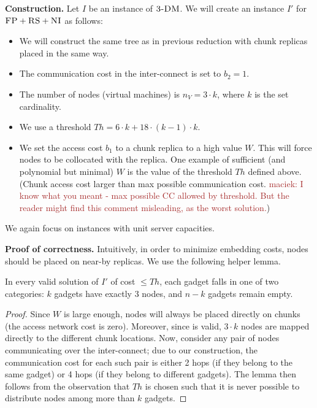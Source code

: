 \documentclass[9pt]{sigcomm-alternate}
\newcommand{\maciek}[1]{\textcolor{brown}{maciek: #1}}
\newcommand{\CC}{\textsc{NI}}
\newcommand{\FP}{\textsc{FP}}
\newcommand{\RS}{\textsc{RS}}
\newcommand{\CostTrans}{\ensuremath{b_1}}
\newcommand{\CostCom}{\ensuremath{b_2}}
\newcommand{\Vms}{\ensuremath{n_V}}
\newcommand{\TDM}{\textsc{3-DM}}
\newcommand{\Thr}{\ensuremath{Th}}
\begin{document}
\textbf{Construction.}
Let $I$ be an instance of $\TDM$. We will create an instance $I'$
for $\FP+\RS+\CC$ as follows:
\begin{itemize}
\item We will construct the same tree as in previous reduction with
chunk replicas placed in the same way.
\item The communication cost in the inter-connect is set to $\CostCom = 1$.
\item The number of nodes (virtual machines) is $\Vms = 3 \cdot k$, where $k$ is the set cardinality.
\item We use a threshold $\Thr =  6 \cdot k + 18 \cdot
(k - 1) \cdot k$.
\item We set the access cost $\CostTrans$ to a chunk replica to a high value $W$. This will force
nodes to be collocated with the replica. One example of sufficient
(and polynomial but minimal) $W$
is the value of the threshold $\Thr$ defined above. (Chunk access cost larger than max possible
communication cost. \maciek{I know what you meant - max possible CC allowed by threshold. But the reader might find this comment misleading, as the worst solution.})
\end{itemize}

We again focus on instances with unit server capacities.

\textbf{Proof of correctness.}
Intuitively, in order to minimize embedding costs,
nodes should be placed on near-by replicas. We use the following
helper lemma.
\begin{lemma}\label{lemma:helper}
In every valid solution of $I'$ of cost $\leq \Thr$, each gadget
falls in one of two categories:
$k$ gadgets have exactly
$3$ nodes, and $n-k$ gadgets remain empty.
\end{lemma}
\begin{proof}
Since $W$ is large enough, nodes will always be placed
directly on chunks (the access network cost is zero).
Moreover, since
is valid, $3 \cdot k$ nodes are mapped
directly to the different chunk locations.
Now, consider any pair of nodes communicating over the
inter-connect; due to our construction, the communication cost
for each such pair is either
2 hops (if they belong to the same gadget) or 4 hops (if they belong
to different gadgets).
The lemma then follows from the observation that $\Thr$
is chosen such that it is never possible to distribute nodes
among more than $k$ gadgets.
\end{proof}
\end{document}

